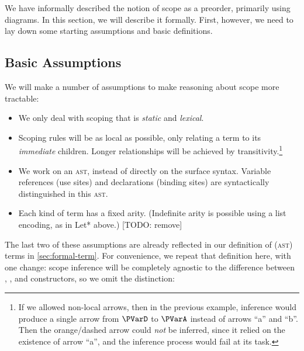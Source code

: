We have informally described the notion of scope as a preorder,
primarily using diagrams. In this section, we will describe it
formally. First, however, we need to lay down some
starting assumptions and basic definitions.

\subsection{Basic Assumptions}
\label{sec:rscope-prelim}

We will make a number of assumptions to make reasoning about scope
more tractable:
  \begin{itemize}
  \item We only deal with scoping that is \emph{static} and \emph{lexical}.
  \item Scoping rules will be as local as possible, only relating a
    term to its \emph{immediate} children. Longer relationships will
    be achieved by transitivity.\footnote{
      If we allowed non-local arrows, then in the previous example,
      inference would produce a single arrow from $\PVarD$
      to $\PVarA$ instead of arrows ``a'' and ``b''. Then the orange/dashed arrow
      could \emph{not} be inferred, since it relied on the existence
      of arrow ``a'', and the inference process would fail at its task.
      }
  \item We work on an \textsc{ast}, instead of directly on the surface
    syntax.  Variable references (use sites) and declarations
    (binding sites) are syntactically distinguished in this
    \textsc{ast}.
  \item Each kind of term has a fixed arity. (Indefinite arity is
    possible using a list encoding, as in Let* above.) [TODO: remove]
\end{itemize}

The last two of these assumptions are already reflected in our
definition of (\textsc{ast}) terms in \cref{sec:formal-term}.
For convenience, we repeat that definition here, with one change:
scope inference will be completely agnostic to the difference between
, , and  constructors, so we omit the
distinction:

